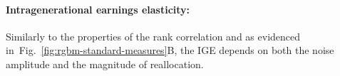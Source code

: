 \documentclass[11pt]{article}
\newcommand{\ie}{{\it i.e.}\xspace}
\newcommand{\fref}[1]{Fig.~\ref{fig:#1}}
\numberwithin{equation}{section}
\begin{document}
\paragraph{Intragenerational earnings elasticity:} Similarly to the properties of the rank correlation and as evidenced in~\fref{rgbm-standard-measures}B, the IGE depends on both the noise amplitude and the magnitude of reallocation.



\end{document}
